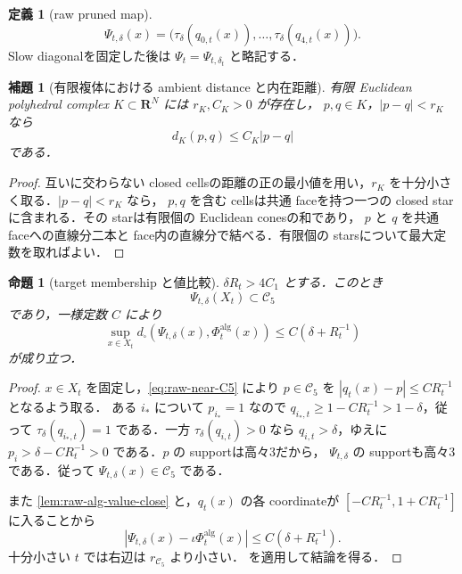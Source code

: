 \documentclass[a4paper,11pt]{ltjsarticle}
\numberwithin{equation}{section}
\theoremstyle{plain}
\newtheorem{proposition}[proposition]{命題}
\newtheorem{lemma}[lemma]{補題}
\theoremstyle{definition}
\newtheorem{definition}[definition]{定義}
\theoremstyle{remark}
\newcommand{\RR}{\mathbf R}
\newcommand{\cC}{\mathcal C}
\begin{document}
\begin{definition}[raw pruned map]\label{def:raw-pruned-map}
\begin{equation}\label{eq:raw-pruned-map}
 \Psi_{t,\delta}(x)=
 \bigl(\tau_\delta(q_{0,t}(x)),\ldots,\tau_\delta(q_{4,t}(x))\bigr).
\end{equation}
Slow diagonalを固定した後は $\Psi_t=\Psi_{t,\delta_t}$ と略記する．
\end{definition}

\begin{lemma}[有限複体における ambient distance と内在距離]\label{lem:finite-complex-local-metric}
有限 Euclidean polyhedral complex $K\subset\RR^N$ には $r_K,C_K>0$ が存在し，
$p,q\in K$，$|p-q|<r_K$ なら
\[
 d_K(p,q)\le C_K|p-q|
\]
である．
\end{lemma}

\begin{proof}
互いに交わらない closed cellsの距離の正の最小値を用い，$r_K$ を十分小さく取る．$|p-q|<r_K$ なら，
$p,q$ を含む cellsは共通 faceを持つ一つの closed starに含まれる．その starは有限個の Euclidean conesの和であり，
$p$ と $q$ を共通 faceへの直線分二本と face内の直線分で結べる．有限個の starsについて最大定数を取ればよい．
\end{proof}

\begin{proposition}[target membership と値比較]\label{prop:raw-pruning}
$\delta R_t>4C_1$ とする．このとき
\[
 \Psi_{t,\delta}(X_t)\subset\cC_5
\]
であり，一様定数 $C$ により
\begin{equation}\label{eq:raw-pruning-comparison}
 \sup_{x\in X_t}d_\square(\Psi_{t,\delta}(x),\Phi_t^{\mathrm{alg}}(x))
 \le C(\delta+R_t^{-1})
\end{equation}
が成り立つ．
\end{proposition}

\begin{proof}
$x\in X_t$ を固定し，\cref{eq:raw-near-C5} により $p\in\cC_5$ を $|q_t(x)-p|\le CR_t^{-1}$ となるよう取る．
ある $i_*$ について $p_{i_*}=1$ なので $q_{i_*,t}\ge1-CR_t^{-1}>1-\delta$，従って
$\tau_\delta(q_{i_*,t})=1$ である．一方 $\tau_\delta(q_{i,t})>0$ なら
$q_{i,t}>\delta$，ゆえに $p_i>\delta-CR_t^{-1}>0$ である．$p$ の supportは高々3だから，
$\Psi_{t,\delta}$ の supportも高々3である．従って $\Psi_{t,\delta}(x)\in\cC_5$ である．

また \cref{lem:raw-alg-value-close} と，$q_t(x)$ の各 coordinateが $[-CR_t^{-1},1+CR_t^{-1}]$ に入ることから
\[
 |\Psi_{t,\delta}(x)-\iota\Phi_t^{\mathrm{alg}}(x)|\le C(\delta+R_t^{-1}).
\]
十分小さい $t$ では右辺は $r_{\cC_5}$ より小さい． を適用して結論を得る．
\end{proof}
\end{document}
